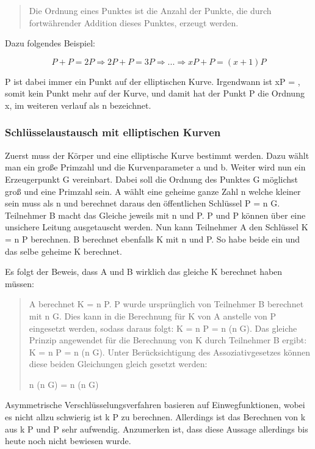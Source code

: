 			\begin{quote}
				\begin{defi}
					Die Ordnung eines Punktes ist die Anzahl der Punkte, die durch fortwährender Addition dieses Punktes, erzeugt werden.\cite{Information:und:Kommunikation}
				\end{defi}
			\end{quote}
			
			Dazu folgendes Beispiel:
			
			\begin{displaymath}
			P + P = 2P \Rightarrow 2P +P = 3P \Rightarrow ... \Rightarrow xP + P = (x+1)P
			\end{displaymath}
			
			P ist dabei immer ein Punkt auf der elliptischen Kurve. Irgendwann ist xP = \myInfty, somit kein Punkt mehr auf der Kurve, und damit hat der Punkt P die Ordnung x, im weiteren verlauf als n bezeichnet.
			
		\subsubsection{Schlüsselaustausch mit elliptischen Kurven}
			Zuerst muss der Körper und eine elliptische Kurve bestimmt werden. Dazu wählt man ein große Primzahl und die Kurvenparameter a und b. Weiter wird nun ein Erzeugerpunkt G vereinbart. Dabei soll die Ordnung des Punktes G möglichst groß und eine Primzahl sein. A wählt eine geheime ganze Zahl n welche kleiner sein muss als n und berechnet daraus den öffentlichen Schlüssel P = n \mycdot G. Teilnehmer B macht das Gleiche jeweils mit n und P. P und P können über eine unsichere Leitung ausgetauscht werden. Nun kann Teilnehmer A den Schlüssel K = n \mycdot P berechnen. B berechnet ebenfalls K mit n und P. So habe beide ein und das selbe geheime K berechnet.
			
			Es folgt der Beweis, dass A und B wirklich das gleiche K berechnet haben müssen:
			\begin{quote}
				\begin{beweis}
					A berechnet K = n \mycdot P\myTiefstellen{B}. P wurde ursprünglich von Teilnehmer B berechnet mit n \mycdot G. Dies kann in die Berechnung für K von A anstelle von P eingesetzt werden, sodass daraus folgt: K = n \mycdot P = n \mycdot (n \mycdot G). Das gleiche Prinzip angewendet für die Berechnung von K durch Teilnehmer B ergibt: K = n \mycdot P = n \mycdot (n \mycdot G). Unter Berücksichtigung des Assoziativgesetzes können diese beiden Gleichungen gleich gesetzt werden:
					
					\centering n \mycdot (n \mycdot G) = n \mycdot (n\myTiefstellen{A} \mycdot G)
				\end{beweis}
			\end{quote}
			
			Asymmetrische Verschlüsselungsverfahren basieren auf Einwegfunktionen, wobei es nicht allzu schwierig ist k \mycdot P zu berechnen. Allerdings ist das Berechnen von k aus k \mycdot P und P sehr aufwendig. Anzumerken ist, dass diese Aussage allerdings bis heute noch nicht bewiesen wurde.
